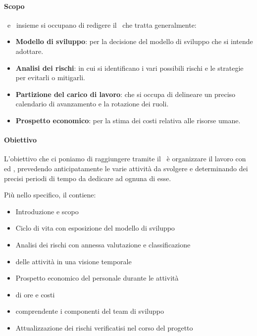 			\paragraph{Scopo}
			\Res\ e \Amm\ insieme si occupano di redigere il \PdP\ che tratta generalmente:
			\begin{itemize}
				\item \textbf{Modello di sviluppo}: per la decisione del modello di sviluppo che si intende adottare.
				\item \textbf{Analisi dei rischi}: in cui si identificano i vari possibili rischi e le strategie per evitarli o mitigarli.
				\item \textbf{Partizione del carico di lavoro}: che si occupa di delineare un preciso calendario di avanzamento e la rotazione dei ruoli.
				\item \textbf{Prospetto economico}: per la stima dei costi relativa alle risorse umane.
			\end{itemize}

			\paragraph{Obiettivo}
			L'obiettivo che ci poniamo di raggiungere tramite il \PdP\ è organizzare il lavoro con  ed ,
			prevedendo anticipatamente le varie attività da svolgere e determinando dei precisi periodi di tempo da dedicare ad ognuna di esse.\par
			Più nello specifico, il \Doc{\PdPv} contiene:
			\begin{itemize}
				\item Introduzione e scopo
				\item Ciclo di vita con esposizione del modello di sviluppo
				\item Analisi dei rischi con annessa valutazione e classificazione
				\item {} delle attività in una visione temporale
				\item Prospetto economico del personale durante le attività
				\item {} di ore e costi
				\item {} comprendente i componenti del team di sviluppo
				\item Attualizzazione dei rischi verificatisi nel corso del progetto
			\end{itemize}


